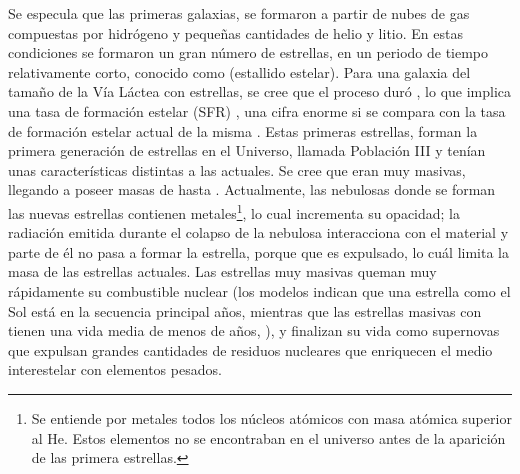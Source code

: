 Se especula que las primeras galaxias, se formaron a partir de nubes de gas compuestas por hidrógeno y pequeñas cantidades de helio y litio. En estas condiciones se formaron un gran número de estrellas, en un periodo de tiempo relativamente corto, conocido como  (estallido estelar). Para una galaxia del tamaño de la Vía Láctea con  estrellas, se cree que el proceso duró , lo que implica una tasa de formación estelar (SFR) , una cifra enorme si se compara con la tasa de formación estelar actual de la misma  \citep{book:encyclopedia}. Estas primeras estrellas, forman la primera generación de estrellas en el Universo, llamada Población III y tenían unas características distintas a las actuales. Se cree que eran muy masivas, llegando a poseer masas de hasta . Actualmente, las nebulosas donde se forman las nuevas estrellas contienen metales\footnote{ Se entiende por metales todos los núcleos atómicos con masa atómica superior al He. Estos elementos no se encontraban en el universo antes de la aparición de las primera estrellas.}, lo cual incrementa su opacidad; la radiación emitida durante el colapso de la nebulosa interacciona con el material y parte de él no pasa a formar la estrella, porque que es expulsado, lo cuál limita la masa de las estrellas actuales. Las estrellas muy masivas queman muy rápidamente su combustible nuclear (los modelos indican que una estrella como el Sol está en la secuencia principal  años, mientras que las estrellas masivas con  tienen una vida media de menos de  años, \citealt{book:encyclopedia}), y finalizan su vida como supernovas que expulsan grandes cantidades de residuos nucleares que enriquecen el medio interestelar con elementos pesados.

